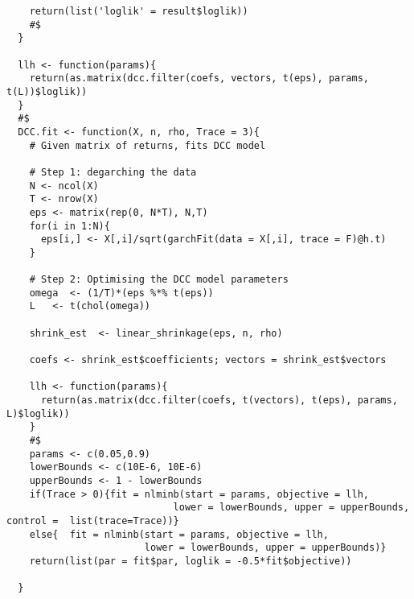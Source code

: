 \begin{lstlisting}
    return(list('loglik' = result$loglik))
    #$
  }

  llh <- function(params){
    return(as.matrix(dcc.filter(coefs, vectors, t(eps), params, t(L))$loglik))
  }
  #$
  DCC.fit <- function(X, n, rho, Trace = 3){
    # Given matrix of returns, fits DCC model

    # Step 1: degarching the data
    N <- ncol(X)
    T <- nrow(X)
    eps <- matrix(rep(0, N*T), N,T)
    for(i in 1:N){
      eps[i,] <- X[,i]/sqrt(garchFit(data = X[,i], trace = F)@h.t)
    }

    # Step 2: Optimising the DCC model parameters
    omega  <- (1/T)*(eps %*% t(eps))
    L   <- t(chol(omega))

    shrink_est  <- linear_shrinkage(eps, n, rho)

    coefs <- shrink_est$coefficients; vectors = shrink_est$vectors

    llh <- function(params){
      return(as.matrix(dcc.filter(coefs, t(vectors), t(eps), params, L)$loglik))
    }
    #$
    params <- c(0.05,0.9)
    lowerBounds <- c(10E-6, 10E-6)
    upperBounds <- 1 - lowerBounds
    if(Trace > 0){fit = nlminb(start = params, objective = llh,
                             lower = lowerBounds, upper = upperBounds, control =  list(trace=Trace))}
    else{  fit = nlminb(start = params, objective = llh,
                        lower = lowerBounds, upper = upperBounds)}
    return(list(par = fit$par, loglik = -0.5*fit$objective))

  }

\end{lstlisting}
